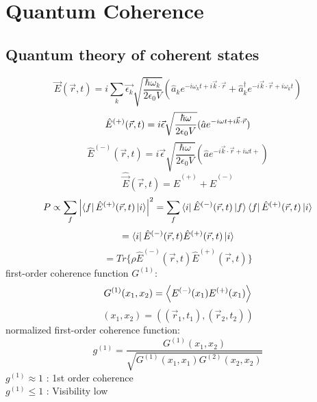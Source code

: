 \documentclass[9pt]{article}
\begin{document}
\section{Quantum Coherence}
\subsection{Quantum theory of coherent states}
\begin{equation*}
    \vec{E}(\vec{r},t)=i\sum_k\vec{\epsilon_k}\sqrt{\frac{\hbar\omega_k}{2\epsilon_0 V}}(\hat{a}_k e^{-i\omega_k t + i\vec{k}\cdot\vec{r}}+
    \hat{a}_k^\dagger e^{-i\vec{k}\cdot\vec{r} + i\omega_k t})
\end{equation*}
\begin{equation*}
    \hat{E}^{(+)}(\vec{r},t)=i\vec{\epsilon}\sqrt{\frac{\hbar\omega}{2\epsilon_0 V}}(\hat{a} e^{-i\omega t + i\vec{k}\cdot\vec{r}}) \\
\end{equation*}
\begin{equation*}  
    \hat{E}^{(-)}(\vec{r},t)=i\vec{\epsilon}\sqrt{\frac{\hbar\omega}{2\epsilon_0 V}}(\hat{a} e^{-i\vec{k}\cdot\vec{r}+i\omega t + })
\end{equation*}
\begin{equation*}
    \hat{\vec{E}}(\vec{r},t)=\hat{E}^{(+)}+\hat{E}^{(-)}
\end{equation*}
\begin{equation*}
    P\propto\sum_f\abs{\bra{f}\hat{E}^{(+)}(\vec{r},t)\ket{i}}^2=\sum_f\bra{i}\hat{E}^{(-)}(\vec{r},t)\ket{f}\bra{f}\hat{E}^{(+)}(\vec{r},t)\ket{i}
\end{equation*}
\begin{equation*}
    =\bra{i}\hat{E}^{(-)}(\vec{r},t)\hat{E}^{(+)}(\vec{r},t)\ket{i}
\end{equation*}
\begin{equation*}
    =Tr\{\rho\hat{E}^{(-)}(\vec{r},t)\hat{E}^{(+)}(\vec{r},t)\}
\end{equation*}
first-order coherence function $G^{(1)}$:
\begin{equation*}
    G^{(1)}(x_1,x_2)=\ev{E^{(-)}(x_1)E^{(+)}(x_1)}
\end{equation*}
\begin{equation*}
    (x_1,x_2)=((\vec{r}_1,t_1),(\vec{r}_2,t_2))
\end{equation*}
normalized first-order coherence function:
\begin{equation*}
    g^{(1)}=\frac{G^{(1)}(x_1,x_2)}{\sqrt{G^{(1)}(x_1,x_1)G^{(2)}(x_2,x_2)}}
\end{equation*}
$ g^{(1)}\approx 1 $ : 1st order coherence \\
$ g^{(1)}\leq 1 $ : Visibility low
\end{document}
